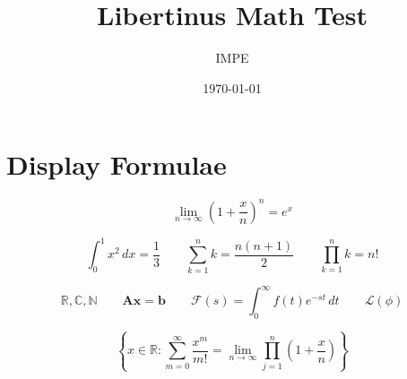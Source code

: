 \documentclass[12pt]{article}
\title{Libertinus Math Test}
\author{IMPE}
\date{\today}
\begin{document}
\maketitle

\section{Display Formulae}

\[
  \lim_{n \to \infty}
  \left(1 + \frac{x}{n}\right)^n
  = e^x
\]

\[
  \int_0^1 x^2 \, dx = \frac{1}{3}
  \qquad
  \sum_{k=1}^{n} k = \frac{n(n+1)}{2}
  \qquad
  \prod_{k=1}^{n} k = n!
\]

\[
  \mathbb{R}, \mathbb{C}, \mathbb{N}
  \qquad
  \mathbf{A}\mathbf{x} = \mathbf{b}
  \qquad
  \mathscr{F}(s) = \int_0^\infty f(t)e^{-st}\,dt
  \qquad
  \mathcal{L}(\phi)
\]

\[
  \left\{
    x \in \mathbb{R} :
    \sum_{m=0}^{\infty}
    \frac{x^m}{m!}
    =
    \lim_{n\to\infty}
    \prod_{j=1}^{n}
    \left(1+\frac{x}{n}\right)
  \right\}
\]
\end{document}
